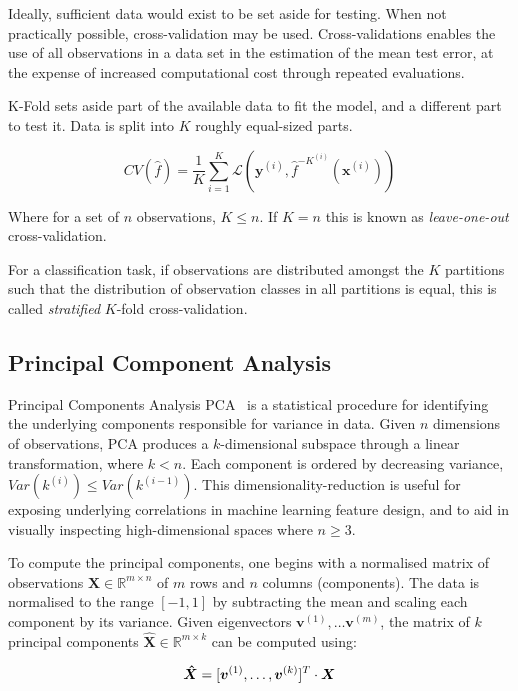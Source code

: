 Ideally, sufficient data would exist to be set aside for testing. When not practically possible, cross-validation may be used. Cross-validations enables the use of all observations in a data set in the estimation of the mean test error, at the expense of increased computational cost through repeated evaluations.

K-Fold sets aside part of the available data to fit the model, and a different part to test it. Data is split into $K$ roughly equal-sized parts.

\begin{equation}
  CV(\hat{f}) = \frac{1}{K}\sum_{i=1}^K \mathcal{L}(\bm{y}^{(i)}, \hat{f}^{-K^{(i)}}(\bm{x}^{(i)}))
\end{equation}

Where for a set of $n$ observations, $K \le n$. If $K=n$ this is known as \emph{leave-one-out} cross-validation.

For a classification task, if observations are distributed amongst the $K$ partitions such that the distribution of observation classes in all partitions is equal, this is called \emph{stratified} $K$-fold cross-validation.


\subsection{Principal Component Analysis}

Principal Components Analysis PCA~\cite{Jolliffe2011} is a statistical procedure for identifying the underlying components responsible for variance in data. Given $n$ dimensions of observations, PCA produces a $k$-dimensional subspace through a linear transformation, where $k < n$. Each component is ordered by decreasing variance, $Var(k^{(i)}) \le Var(k^{(i-1)})$. This dimensionality-reduction is useful for exposing underlying correlations in machine learning feature design, and to aid in visually inspecting high-dimensional spaces where $n \ge 3$.

To compute the principal components, one begins with a normalised matrix of observations $\bm{X} \in \mathbb{R}^{m \times n}$ of $m$ rows and $n$ columns (components). The data is normalised to the range $[-1,1]$ by subtracting the mean and scaling each component by its variance. Given eigenvectors $\bm{v}^{(1)}, \ldots \bm{v}^{(m)}$, the matrix of $k$ principal components $\bm{\hat{X}} \in \mathbb{R}^{m \times k}$ can be computed using:

\begin{equation}
\bm{\hat{X}} = [ \bm{v}^{(1)}, \ldots, \bm{v}^{(k)}]^T \cdot \bm{X}\\
\end{equation}

